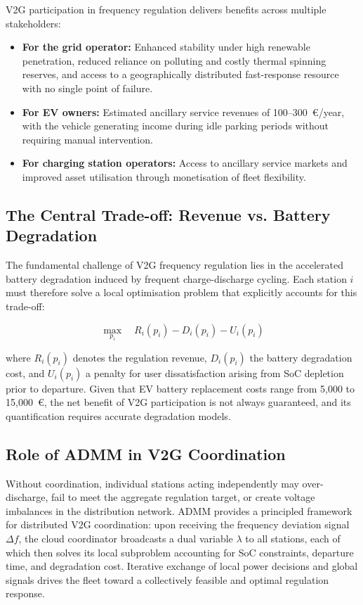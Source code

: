 \documentclass[review]{elsarticle}
\begin{document}
V2G participation in frequency regulation delivers benefits across 
multiple stakeholders:

\begin{itemize}
    \item \textbf{For the grid operator:} Enhanced stability under high 
    renewable penetration, reduced reliance on polluting and costly 
    thermal spinning reserves, and access to a geographically distributed 
    fast-response resource with no single point of failure.

    \item \textbf{For EV owners:} Estimated ancillary service revenues 
    of 100--300~\euro/year, with the vehicle generating income during 
    idle parking periods without requiring manual intervention.

    \item \textbf{For charging station operators:} Access to ancillary 
    service markets and improved asset utilisation through monetisation 
    of fleet flexibility.
\end{itemize}

\subsection{The Central Trade-off: Revenue vs. Battery Degradation}

The fundamental challenge of V2G frequency regulation lies in the 
accelerated battery degradation induced by frequent charge-discharge 
cycling. Each station $i$ must therefore solve a local optimisation 
problem that explicitly accounts for this trade-off:

\begin{equation}
    \max_{p_i} \quad R_i(p_i) - D_i(p_i) - U_i(p_i)
\end{equation}

where $R_i(p_i)$ denotes the regulation revenue, $D_i(p_i)$ the battery 
degradation cost, and $U_i(p_i)$ a penalty for user dissatisfaction 
arising from SoC depletion prior to departure. Given that EV battery 
replacement costs range from 5,000 to 15,000~\euro, the net benefit of 
V2G participation is not always guaranteed, and its quantification 
requires accurate degradation models.

\subsection{Role of ADMM in V2G Coordination}

Without coordination, individual stations acting independently may 
over-discharge, fail to meet the aggregate regulation target, or 
create voltage imbalances in the distribution network. ADMM provides 
a principled framework for distributed V2G coordination: upon receiving 
the frequency deviation signal $\Delta f$, the cloud coordinator 
broadcasts a dual variable $\lambda$ to all stations, each of which 
then solves its local subproblem accounting for SoC constraints, 
departure time, and degradation cost. Iterative exchange of local 
power decisions and global signals drives the fleet toward a 
collectively feasible and optimal regulation response.
\end{document}
